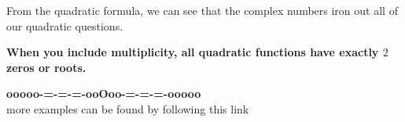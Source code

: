 \documentclass{ximera}
\begin{document}
From the quadratic formula, we can see that the complex numbers iron out all of our quadratic questions.

\begin{center}
\textbf{\textcolor{red!70!black}{When you include multiplicity, all quadratic functions have exactly $2$ zeros or roots.}}
\end{center}


























\begin{center}
\textbf{\textcolor{green!50!black}{ooooo-=-=-=-ooOoo-=-=-=-ooooo}} \\

more examples can be found by following this link\\ 

\end{center}
\end{document}
